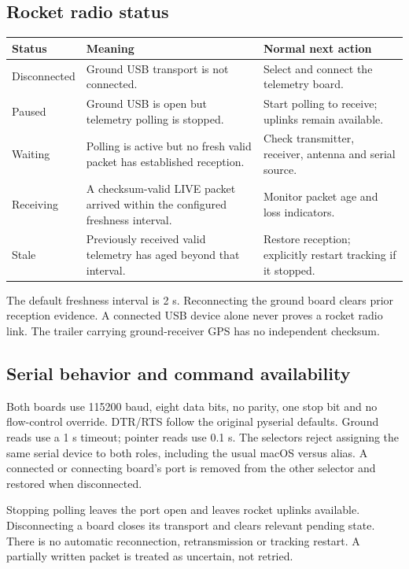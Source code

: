 \subsection{Rocket radio status}
\begin{longtable}{@{}L{.20\linewidth}L{.38\linewidth}L{.35\linewidth}@{}}
\toprule Status & Meaning & Normal next action \\\midrule\endhead
Disconnected & Ground USB transport is not connected. & Select and connect the telemetry board. \\
Paused & Ground USB is open but telemetry polling is stopped. & Start polling to receive; uplinks remain available. \\
Waiting & Polling is active but no fresh valid packet has established reception. & Check transmitter, receiver, antenna and serial source. \\
Receiving & A checksum-valid LIVE packet arrived within the configured freshness interval. & Monitor packet age and loss indicators. \\
Stale & Previously received valid telemetry has aged beyond that interval. & Restore reception; explicitly restart tracking if it stopped. \\
\bottomrule
\end{longtable}
The default freshness interval is 2 s. Reconnecting the ground board clears prior
reception evidence. A connected USB device alone never proves a rocket radio
link. The trailer carrying ground-receiver GPS has no independent checksum.

\subsection{Serial behavior and command availability}
Both boards use 115200 baud, eight data bits, no parity, one stop bit and no
flow-control override. DTR/RTS follow the original pyserial defaults.
Ground reads use a 1 s timeout; pointer reads use 0.1 s. The selectors reject
assigning the same serial device to both roles, including the usual macOS
 versus  alias. A connected or connecting
board's port is removed from the other selector and restored when disconnected.

Stopping polling leaves the port open and leaves rocket uplinks available.
Disconnecting a board closes its transport and clears relevant pending state.
There is no automatic reconnection, retransmission or tracking restart. A
partially written packet is treated as uncertain, not retried.

